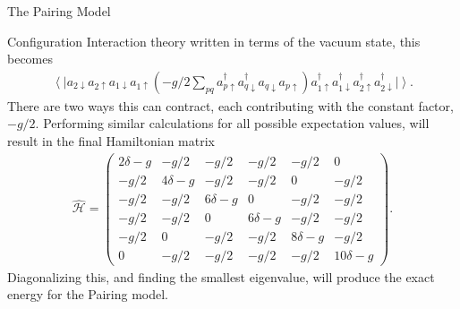 \documentclass[twoside,english]{uiofysmaster}
\begin{document}
\begin{chapter}{The Pairing Model}
\begin{section}{Configuration Interaction theory}
		written in terms of the vacuum state, this becomes 
		\begin{align}
			\left< \right| a_{2 \downarrow}  a_{2 \uparrow} a_{1 \downarrow} a_{1 \uparrow} \left( -g / 2 \sum_{pq} a_{p \uparrow}^{\dagger} a_{q \downarrow}^{\dagger} a_{q \downarrow} a_{p \uparrow} \right) 
			a_{1 \uparrow}^{\dagger} a_{1 \downarrow}^{\dagger} a_{2 \uparrow}^{\dagger} a_{2 \downarrow}^{\dagger} \left| \right>.
		\end{align}
		There are two ways this can contract, each contributing with the constant factor, $-g / 2$. 
		Performing similar calculations for all possible expectation values, will result in the final Hamiltonian matrix 
		\begin{align}
			\hat{\mathcal{H}} = \left( \begin{matrix}
				2 \delta - g & -g / 2 & -g / 2 & -g / 2 & -g / 2 & 0  \\
				-g / 2 & 4 \delta - g & -g / 2 & -g / 2 & 0 & -g / 2  \\
				-g / 2 & -g / 2 & 6 \delta - g & 0 & -g / 2 & -g / 2 \\
				-g / 2 & -g / 2 & 0 & 6 \delta - g & -g / 2 & -g / 2 \\
				-g / 2 & 0 & -g / 2 & -g / 2 & 8 \delta - g & -g / 2 \\
				0 & -g / 2 & -g / 2 & -g / 2 & -g / 2 & 10 \delta - g 
			\end{matrix} \right).
		\end{align}
		Diagonalizing this, and finding the smallest eigenvalue, will produce the exact energy for the Pairing model. 

	\end{section}


\end{chapter}
\end{document}
